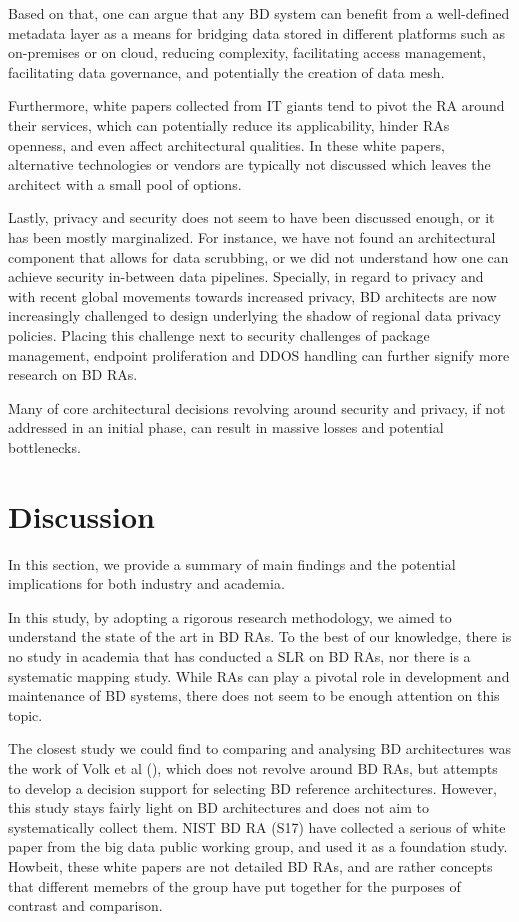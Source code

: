 \documentclass[review]{elsarticle}
\begin{document}
Based on that, one can argue that any BD system can benefit from a well-defined metadata layer as a means for bridging data stored in different platforms such as on-premises or on cloud, reducing complexity, facilitating access management, facilitating data governance, and potentially the creation of data mesh.

Furthermore, white papers collected from IT giants tend to pivot the RA around their services, which can potentially reduce its applicability, hinder RAs openness, and even affect architectural qualities. In these white papers, alternative technologies or vendors are typically not discussed which leaves the architect with a small pool of options.

Lastly, privacy and security does not seem to have been discussed enough, or it has been mostly marginalized. For instance, we have not found an architectural component that allows for data scrubbing, or we did not understand how one can achieve security in-between data pipelines. Specially, in regard to privacy and with recent global movements towards increased privacy, BD architects are now increasingly challenged to design underlying the shadow of regional data privacy policies. Placing this challenge next to security challenges of package management, endpoint proliferation and DDOS handling can further signify more research on BD RAs.

Many of core architectural decisions revolving around security and privacy, if not addressed in an initial phase, can result in massive losses and potential bottlenecks. 

\section{Discussion}

In this section, we provide a summary of main findings and the potential implications for both industry and academia. 

In this study, by adopting a rigorous research methodology, we aimed to understand the state of the art in BD RAs. To the best of our knowledge, there is no study in academia that has conducted a SLR on BD RAs, nor there is a systematic mapping study. While RAs can play a pivotal role in development and maintenance of BD systems, there does not seem to be enough attention on this topic. 

The closest study we could find to comparing and analysing BD architectures was the work of Volk et al (\cite{volk2019decision}), which does not revolve around BD RAs, but attempts to develop a decision support for selecting BD reference architectures. However, this study stays fairly light on BD architectures and does not aim to systematically collect them. NIST BD RA (S17) have collected a serious of white paper from the big data public working group, and used it as a foundation study. Howbeit, these white papers are not detailed BD RAs, and are rather concepts that different memebrs of the group have put together for the purposes of contrast and comparison. 
\end{document}
